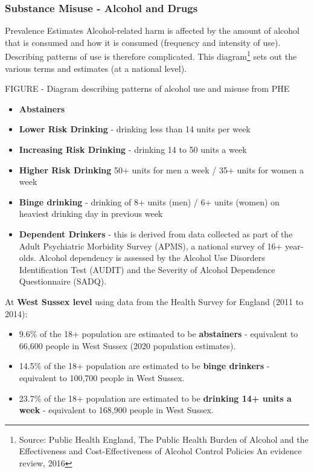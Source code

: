 \subsubsection{Substance Misuse - Alcohol and Drugs} Prevalence Estimates Alcohol-related harm is affected by the amount of alcohol that is consumed and how it is consumed (frequency and intensity of use). Describing patterns of use is therefore complicated. This diagram\footnote{Source: Public Health England, The Public Health Burden of Alcohol and the Effectiveness and Cost-Effectiveness of Alcohol Control Policies An evidence review, 2016} sets out the various terms and estimates (at a national level).

FIGURE - Diagram describing patterns of alcohol use and misuse from PHE

\begin{itemize}[noitemsep]
    \item {\bfseries Abstainers}
    \item {\bfseries Lower Risk Drinking} - drinking less than 14 units per week
    \item {\bfseries Increasing Risk Drinking} - drinking 14 to 50 units a week
    \item {\bfseries Higher Risk Drinking} 50+ units for men a week / 35+ units for women a week
    \item {\bfseries Binge drinking} - drinking of 8+ units (men) / 6+ units (women) on heaviest drinking day in previous week
    \item {\bfseries Dependent Drinkers} - this is derived from data collected as part of the Adult Psychiatric Morbidity Survey (APMS), a national survey of 16+ year-olds. Alcohol dependency is assessed by the Alcohol Use Disorders Identification Test (AUDIT) and the Severity of Alcohol Dependence Questionnaire (SADQ).
\end{itemize}

At {\bfseries West Sussex level} using data from the Health Survey for England (2011 to 2014): 

\begin{itemize}[noitemsep]
    \item 9.6\% of the 18+ population are estimated to be {\bfseries abstainers} - equivalent to 66,600 people in West Sussex (2020 population estimates).
    \item 14.5\% of the 18+ population are estimated to be {\bfseries binge drinkers} - equivalent to 100,700 people in West Sussex.
    \item 23.7\% of the 18+ population are estimated to be {\bfseries drinking 14+ units a week} - equivalent to 168,900 people in West Sussex.
\end{itemize}

